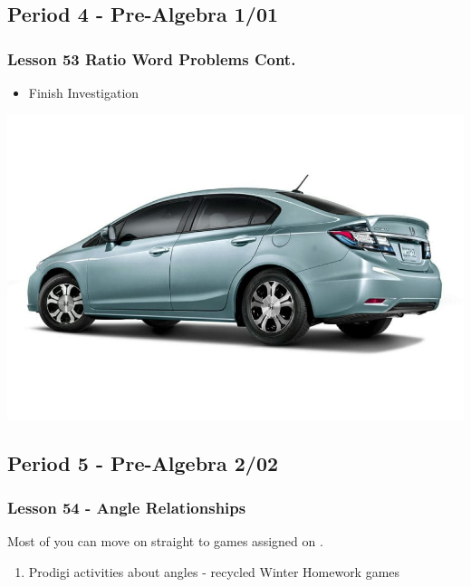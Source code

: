    	 \subsection[PA1/01]{Period 4 - Pre-Algebra 1/01}
   	 \begin{frame}[label=PA1_01]
       		\frametitle{Lesson 53 Ratio Word Problems Cont.}

       		\begin{itemize}
       			\item Finish  Investigation
       		\end{itemize}
       		\vspace{-20pt}
       		\begin{center}
       			\includegraphics[width=0.5\linewidth]{Images/honda_civic}
       		\end{center}
       		\vspace{-20pt}
       	\end{frame}


   	 \subsection[PA2/02]{Period 5 - Pre-Algebra 2/02}
   	 \begin{frame}[label=PA2_02]
   	 \frametitle{Lesson 54 - Angle Relationships}

   	 \begin{alertblock}{}
   	 	Most of you can move on straight to  games assigned on \mangahightext. \\
   	 \end{alertblock}

   	 \begin{enumerate}
   	 	\item \mangahightext
   	 	\rightarrowitem Prodigi activities about angles - recycled Winter Homework
   	 	\rightarrowitem {} games
   	 \end{enumerate}
   	  \end{frame}

